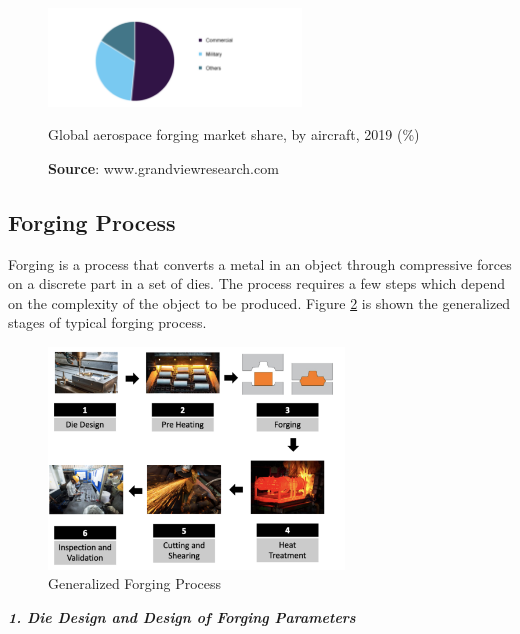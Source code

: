 \begin{figure}[h]
\centering
\includegraphics[width=0.6\textwidth]{./Images/Forg2.png}
\caption{Global aerospace forging market share, by aircraft, 2019 (\%)}
\label{Forg2}
\caption*{\textbf{Source}: www.grandviewresearch.com}
\end{figure}




\subsection{Forging Process}

Forging is a process that converts a metal in an object through compressive forces on a discrete part in a set of dies.
The process requires a few steps which depend on the complexity of the object to be produced.
Figure \ref{ForgingSteps1} is shown the generalized stages of typical forging process.

\begin{figure}[h]
\centering
\includegraphics[width=0.7\textwidth]{./Images/ForgingSteps.png}
\caption{Generalized Forging Process}
\label{ForgingSteps1}
\end{figure}

\textbf{\emph{1. Die Design and Design of Forging Parameters}}\\


